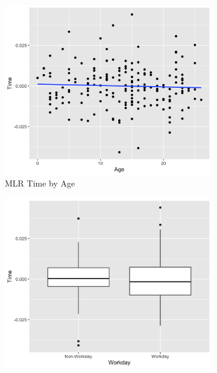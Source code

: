 \documentclass[12pt,twoside,letterpaper]{article}
\theoremstyle{definition}
\theoremstyle{definition}
\begin{document}
    \begin{figure} 
        \centering
        \begin{subfigure}[b]{0.32\textwidth}
        \centering
        \includegraphics[width=\textwidth]{pics/mlr time by age.png}
        \caption[]%
        {{\small MLR Time by Age}}
        \label{fig: time v age}
        \end{subfigure}
        \hfill
        \begin{subfigure}[b]{0.32\textwidth}
        \centering
        \includegraphics[width=\textwidth]{pics/mlr time by day.png}

\end{subfigure}
\end{figure}
\end{document}
